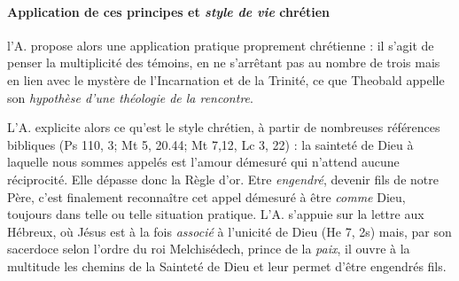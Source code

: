 \paragraph{Application de ces principes et \textit{style de vie} chrétien}
l'A. propose alors une application pratique proprement chrétienne : il s'agit de penser la multiplicité des témoins, en ne s'arrêtant pas au nombre de trois mais en lien avec le mystère de l'Incarnation et de la Trinité, ce que Theobald appelle son \textit{hypothèse d'une théologie de la rencontre}. 
\begin{comment}
    
Jésus suscite l'opposition qui l'amènera à la croix. La notion de réciprocité se métamorphose en règle d'amour, de la \textit{mesure} à la \textit{démesure}. {Jn 10, 20 : il déraisonne. }

    « Sans le correctif du commandement d’amour (…) la Règle d’Or serait sans cesse tirée dans le sens d’une maxime utilitaire dont la formule serait do ut des, je donne pour que tu donnes. La règle : donne parce qu’il t’a été donné, corrige le afin que de la maxime utilitaire et sauve la Règle d’Or d’une interprétation perverse toujours possible » (Ricoeur, Amour et justice, 39). 



[Règle d’or]

     « Tout ce que vous désirez que les autres fassent pour vous, faites-le vous-mêmes
pour eux : voilà la Loi et les Prophètes » (Mt 7,12). 
Avec Jésus, on passe de la justice
(relation de réciprocité) à l’amour (démesure : l’amour des ennemis) et de l’amour à l’amour
définitif. Jésus accomplit donc la Loi et les Prophètes en accomplissant la règle d’or : il la
réalise définitivement en aimant ses ennemis.

Mt 7,12 : règle d'or
\end{comment}
\begin{comment}
    Comme énoncé dans les principes, après avoir pris au sérieux les éléments opposés aux titres de Jésus par l'islam et le judaïsme mais aussi l'espérance  qui apparaît dans les psaumes messianiques, l'A. avance que le processus d'apprentissage spécifique des chrétiens doit être selon le \textit{style de vie} chrétien. 
\end{comment}


 L'A. explicite alors ce qu'est le style chrétien, à partir de nombreuses références bibliques (Ps 110, 3; Mt 5, 20.44; Mt 7,12, Lc 3, 22) : la sainteté de Dieu à laquelle nous sommes appelés est l'amour démesuré qui n'attend aucune réciprocité. Elle dépasse donc la Règle d'or. Etre\textit{ engendré}, devenir fils de notre Père, c'est finalement reconnaître  cet appel démesuré à être \textit{comme} Dieu, toujours dans telle ou telle situation pratique. L'A. s'appuie sur la lettre aux Hébreux, où Jésus est à la fois \textit{associé} à l'unicité de Dieu (He 7, 2s) mais, par son sacerdoce selon l'ordre du roi Melchisédech, prince de la \textit{paix}, il ouvre à la multitude les chemins de la Sainteté de Dieu et leur permet d'être engendrés fils. 


